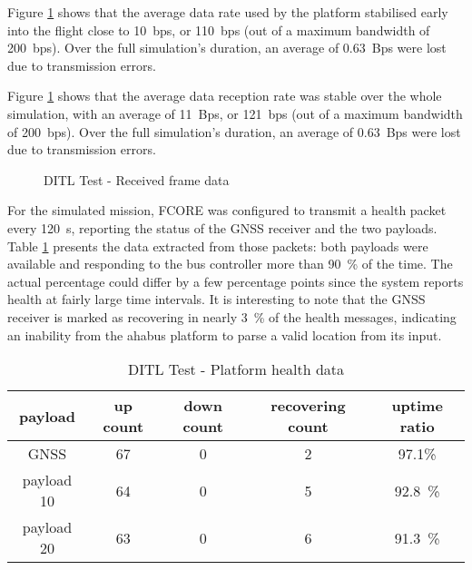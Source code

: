 Figure \ref{fig:ditl-bandwidth} shows that the average data rate used by the
platform stabilised early into the flight close to \SI{10}{bps}, or
\SI{110}{bps} (out of a maximum bandwidth of \SI{200}{bps}). Over the full
simulation's duration, an average of \SI{0.63}{Bps} were lost due to
transmission errors.

Figure \ref{fig:ditl-bandwidth} shows that the average data reception rate was
stable over the whole simulation, with an average of \SI{11}{Bps}, or
\SI{121}{bps} (out of a maximum bandwidth of \SI{200}{bps}). Over the full
simulation's duration, an average of \SI{0.63}{Bps} were lost due to
transmission errors.

\begin{figure}[h]
\centering
\caption{DITL Test - Received frame data}
\label{fig:ditl-bandwidth}
\end{figure}

For the simulated mission, FCORE was configured to transmit a health packet
every \SI{120}{\second}, reporting the status of the GNSS receiver and the
two payloads. Table \ref{tab:ditl-health} presents the data extracted from those
packets: both payloads were available and responding to the bus controller more
than \SI{90}{\percent} of the time. The actual percentage could differ by a few
percentage points since the system reports health at fairly large time
intervals. It is interesting to note that the GNSS receiver is marked as
recovering in nearly \SI{3}{\percent} of the health messages, indicating an
inability from the \acrshort{ahabus} platform to parse a valid location from
its input.

\begin{table}[h]
\begin{center}
\begin{tabular}{c||c c c|c}

payload & up count & down count & recovering count & uptime ratio \\ \hline
GNSS       & 67 & 0 & 2 & 97.1\% \\
payload 10 & 64 & 0 & 5 & \SI{92.8}{\percent} \\
payload 20 & 63 & 0 & 6 & \SI{91.3}{\percent} \\

\end{tabular}
\end{center}
\caption {DITL Test - Platform health data}
\label{tab:ditl-health}
\end{table}

